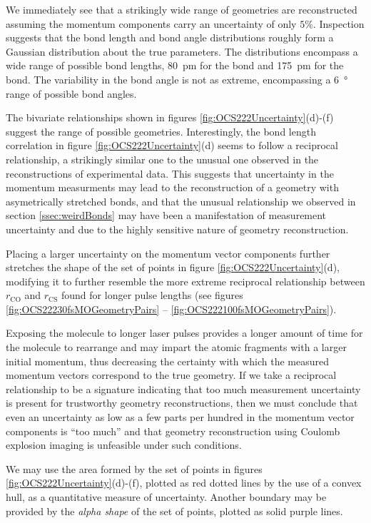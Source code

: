 We immediately see that a strikingly wide range of geometries are reconstructed assuming the momentum components carry an uncertainty of only $5\%$. Inspection suggests that the bond length and bond angle distributions roughly form a Gaussian distribution about the true parameters. The distributions encompass a wide range of possible bond lengths, \SI{80}{\pico\m} for the  bond and \SI{175}{\pico\m} for the  bond. The variability in the bond angle is not as extreme, encompassing a \SI{6}{\degree} range of possible bond angles.

The bivariate relationships shown in figures \ref{fig:OCS222Uncertainty}(d)-(f) suggest the range of possible geometries. Interestingly, the bond length correlation in figure \ref{fig:OCS222Uncertainty}(d) seems to follow a reciprocal relationship, a strikingly similar one to the unusual one observed in the reconstructions of experimental data. This suggests that uncertainty in the momentum measurments may lead to the reconstruction of a geometry with asymetrically stretched bonds, and that the unusual relationship we observed in section \ref{ssec:weirdBonds} may have been a manifestation of measurement uncertainty and due to the highly sensitive nature of geometry reconstruction.

Placing a larger uncertainty on the momentum vector components further stretches the shape of the set of points in figure \ref{fig:OCS222Uncertainty}(d), modifying it to further resemble the more extreme reciprocal relationship between $r_\mathrm{CO}$ and $r_\mathrm{CS}$ found for longer pulse lengths (see figures \ref{fig:OCS22230fsMOGeometryPairs} -- \ref{fig:OCS222100fsMOGeometryPairs}). 

Exposing the molecule to longer laser pulses provides a longer amount of time for the molecule to rearrange and may impart the atomic fragments with a larger initial momentum, thus decreasing the certainty with which the measured momentum vectors correspond to the true geometry. If we take a reciprocal relationship to be a signature indicating that too much measurement uncertainty is present for trustworthy geometry reconstructions, then we must conclude that even an uncertainty as low as a few parts per hundred in the momentum vector components is ``too much'' and that geometry reconstruction using Coulomb explosion imaging is unfeasible under such conditions.

We may use the area formed by the set of points in figures \ref{fig:OCS222Uncertainty}(d)-(f), plotted as red dotted lines by the use of a convex hull, as a quantitative measure of uncertainty. Another boundary may be provided by the \emph{alpha shape} of the set of points, plotted as solid purple lines.

